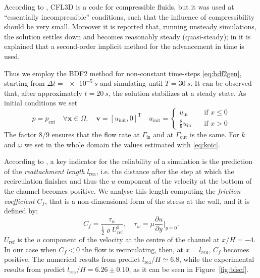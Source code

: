 According to \cite{web:nasa}, CFL3D is a code for compressible fluids, but it was used at ``essentially incompressible'' conditions, such that the influence of compressibility should be very small. Moreover it is reported that, running unsteady simulations, the solution settles down and becomes reasonably steady (quasi-steady); in \cite{bfs:cfl3d} it is explained that a second-order implicit method for the advancement in time is used.

Thus we employ the BDF2 method for non-constant time-steps \eqref{eq:bdf2gen}, starting from $\Delta t = \SI{e-5}{s}$ and simulating until $T = \SI{30}{s}$. It can be observed that, after approximately $t=\SI{20}{s}$, the solution stabilizes at a steady state. As initial conditions we set
\begin{equation}
p=p_\text{ext} \quad \forall \mathbf{x} \in \Omega, \quad \mathbf{v} = [u_\text{init},0]^\mathrm{T} \quad u_\text{init} = \begin{cases}
u_\text{in} \quad&\text{if $x\leq 0$}\\
\frac{8}{9}u_\text{in} \quad&\text{if $x>0$}
\end{cases}
\end{equation}
The factor $8/9$ ensures that the flow rate at $\Gamma_\text{in}$ and at $\Gamma_\text{out}$ is the same. For $k$ and $\omega$ we set in the whole domain the values estimated with \eqref{eq:koic}.

According to \cite{web:nasa}, a key indicator for the reliability of a simulation is the prediction of the \emph{reattachment length} $l_\text{rea}$, i.e. the distance after the step at which the recirculation finishes and thus the $u$ component of the velocity at the bottom of the channel becomes positive. We analyse this length computing the \emph{friction coefficient} $C_f$, that is a non-dimensional form of the stress at the wall, and it is defined by:
\begin{equation}
C_f = \frac{\tau_w}{\frac{1}{2}\varrho U_\text{ref}^2}, \quad \tau_w = \mu \frac{\partial u}{\partial y} \Big|_{y=0}.
\end{equation}
$U_\text{ref}$ is the $u$ component of the velocity at the centre of the channel at $x/H=-4$. In our case when $C_f<0$ the flow is recirculating, then, at $x=l_{rea}$, $C_f$ becomes positive. The numerical results from \cite{web:nasa} predict $l_\text{rea}/H \simeq 6.8$, while the experimental results from \cite{bfs:driver} predict $l_\text{rea}/H = 6.26 \pm 0.10$, as it can be seen in Figure~\ref{fig:bfscf}.

